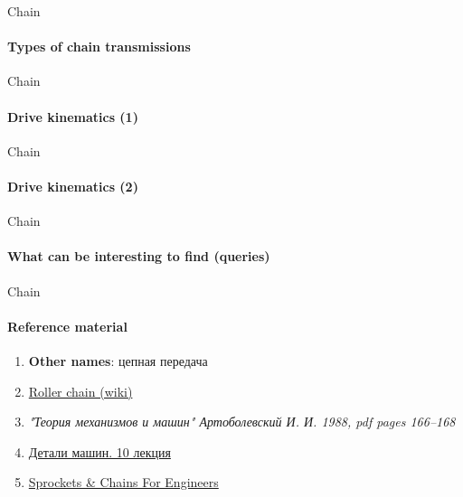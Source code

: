 \documentclass[aspectratio=169]{beamer}
\begin{document}
\begin{frame}[t]{Chain}
    \framesubtitle{Types of chain transmissions}

\end{frame}

\begin{frame}[t]{Chain}
    \framesubtitle{Drive kinematics (1)}

\end{frame}

\begin{frame}[t]{Chain}
    \framesubtitle{Drive kinematics (2)}

\end{frame}

\begin{frame}[t]{Chain}
    \framesubtitle{What can be interesting to find (queries)}

\end{frame}

\begin{frame}[t]{Chain}
    \framesubtitle{Reference material}
    \begin{enumerate}
        \item \textbf{Other names}: цепная передача
        \item \href{https://en.wikipedia.org/wiki/Roller_chain}{Roller chain (wiki)}
        \item \textit{"Теория механизмов и машин" Артоболевский И. И. 1988, pdf pages 166--168 }
        \item \href{https://studfile.net/preview/2156460/}{Детали машин. 10 лекция}
        \item \href{https://www.youtube.com/watch?v=F7o3LOtKEA8}{Sprockets \& Chains For Engineers}
    \end{enumerate}
\end{frame}
\end{document}
